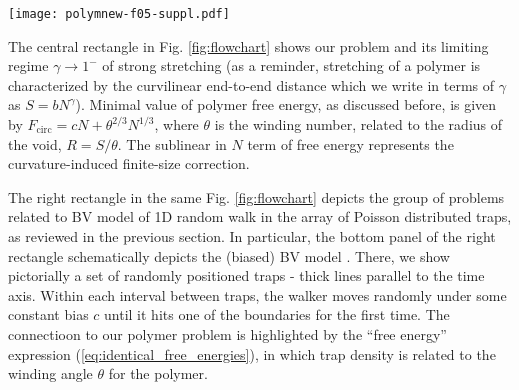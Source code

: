 \documentclass[aps,pre,floatfix,twocolumn,nofootinbib]{revtex4-2}
\begin{document}
\begin{figure*}
\texttt{[image: polymnew-f05-suppl.pdf]}
  \caption{Flowchart of logical connections: place of our ``2D polymer stretching above a curved boundary'' problem in the context of other models and systems in statistical physics.  \textbf{Central column} -- 2D polymer (\textit{top}) and (1+1)D polymer (\textit{bottom}) are equivalent in the strong stretching regime, with free energy $F_{\mathrm{circ}} = c N + \theta^{2/3} N^{1/3}$. \textbf{Right column} -- polymer problem in the proper limit maps onto biased Brownian motion in an array of Poisson distributed traps (\textit{top}), or, equivalently, related to the spectrum of the off-diagonal random Bernoulli matrix (\textit{bottom}).  \textbf{Left column} -- curved polymer stretching problem is a mean field approximation for the top line in the system of (1+1)D vicious (mutually non-intersecting) walks (\textit{center}), which is in turn related to either directed polymer in Gaussian disorder (\textit{top}) and to the maximal eigenvalue statistics in the spectrum of random matrices (\textit{bottom}).  The common motif is the $N^{1/3}$ scaling of the subleading correction term that controls relevant physics in all cases. }%
  \label{fig:flowchart}
\end{figure*}

The central rectangle in Fig. \ref{fig:flowchart} shows our problem and its limiting regime $\gamma\to 1^{-}$ of strong stretching (as a reminder, stretching of a polymer is characterized by the curvilinear end-to-end distance which we write in terms of $\gamma$ as $S = b N^{\gamma}$).  Minimal value of polymer free energy, as discussed before, is given by $F_{\mathrm{circ}} = c N + \theta^{2/3} N^{1/3}$, where $\theta$ is the winding number, related to the radius of the void, $R = S/ \theta$. The sublinear in $N$ term of free energy represents the curvature-induced finite-size correction.


The right rectangle in the same Fig. \ref{fig:flowchart} depicts the group of problems related to BV model of 1D random walk in the array of Poisson distributed traps, as reviewed in the previous section.  In particular, the bottom panel of the right rectangle schematically depicts the (biased) BV model \cite{balagurov}.  There, we show pictorially a set of randomly positioned traps - thick lines parallel to the time axis.  Within each interval between traps, the walker moves randomly under some constant bias $c$ until it hits one of the boundaries for the first time.  The connectioon to our polymer problem is highlighted by the ``free energy'' expression (\ref{eq:identical_free_energies}), in which trap density is related to the winding angle $\theta$ for the polymer.
\end{document}
